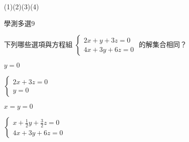 \begin{QUESTIONS}
\begin{QUESTION}
\begin{QBODY}
        \end{QBODY}
        \begin{QFROMS}
        \end{QFROMS}
        \begin{QTAGS}\end{QTAGS}
        \begin{QANS}
            (1)(2)(3)(4)
        \end{QANS}
        \begin{QSOLLIST}
        \end{QSOLLIST}
        \begin{QEMPTYSPACE}
        \end{QEMPTYSPACE}
    \end{QUESTION}
    \begin{QUESTION}
        \begin{ExamInfo}{91}{學測}{多選}{9}
        \end{ExamInfo}
        \begin{ExamAnsRateInfo}{31}{53}{26}{14}
        \end{ExamAnsRateInfo}
        \begin{QBODY}
            下列哪些選項與方程組 $\left\{ \begin{array}{l} 2x+y+3z=0 \\ 4x+3y+6z =0 \end{array}\right.$ 的解集合相同？
            
            \begin{QOPS} 
                \QOP $y=0$ 
                
                \QOP 
                $\left\{ \begin{array}{l} 2x+3z=0 \\y=0 \end{array}\right.$
                
                \QOP
                $x=y=0$
                
                \QOP
                $\left\{ \begin{array}{l} x+\frac{1}{2}y+\frac{3}{2}z=0 \\ 4x+3y+6z =0 \end{array}\right.$
                

\end{QOPS}
\end{QBODY}
\end{QUESTION}
\end{QUESTIONS}

